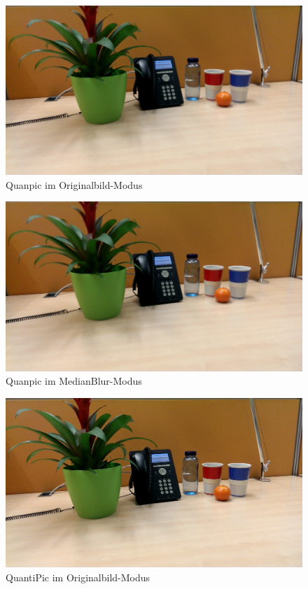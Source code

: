 \begin{landscape}
\begin{figure}[h]
	\centering
		\includegraphics[width=1.4\textwidth]{img/Fotos/QuanPic_Original.png}
	\caption[QuanPic Original]{Quanpic im Originalbild-Modus}
	\label{fig:quan_orig}
\end{figure}

\begin{figure}[h]
	\centering
		\includegraphics[width=1.4\textwidth]{img/Fotos/QuanPic_Medianblur.png}
	\caption[QuanPic MedianBlur]{Quanpic im MedianBlur-Modus}
	\label{fig:quan_med}
\end{figure}

\begin{figure}[h]
	\centering
		\includegraphics[width=1.4\textwidth]{img/Fotos/QuantiPic_Original.png}
	\caption[QuantiPic Originalbild]{QuantiPic im Originalbild-Modus}
	\label{fig:quanti_orig}
\end{figure}


\end{landscape}
